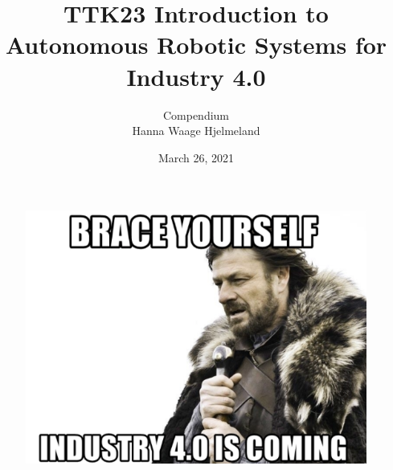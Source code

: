 \documentclass[11pt, a4paper, USenglish]{article} %
\begin{document}
\title{TTK23 Introduction to Autonomous Robotic Systems for Industry 4.0}
\author{Compendium\\
Hanna Waage Hjelmeland}
\date{March 26, 2021}
\begin{titlepage}
    \maketitle
    \begin{figure}[h]
    \centering
        \includegraphics[width=\textwidth]{figures/FaultBasics/robot.png}\\   
    \end{figure}

   \thispagestyle{empty}
\end{titlepage}

%
\newpage
\newpage
\tableofcontents
{}
\thispagestyle{empty}

\newpage
\setcounter{page}{1}










\newpage
\printbibliography
\label{sec:bibliography}
\end{document}
